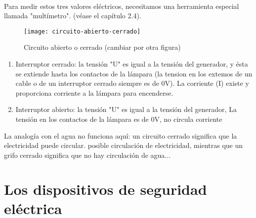 \noindent{}\\

Para medir estos tres valores eléctricos, necesitamos una herramienta especial llamada "multímetro". (véase el capítulo 2.4).

\begin{figure}[h]
\texttt{[image: circuito-abierto-cerrado]} 
\centering
\caption*{Circuito abierto o cerrado (cambiar por otra figura)}
\end{figure}

\begin{enumerate}
\item Interruptor cerrado: la tensión "U" es igual a la tensión del generador, y ésta se extiende hasta los contactos de la lámpara (la tension en los extemos de un cable o de un interruptor cerrado siempre es de 0V). La corriente (I) existe y proporciona corriente a la lámpara para encenderse.
\item Interruptor abierto: la tensión "U" es igual a la tensión del generador, La tensión en los contactos de la lámpara es de 0V, no circula corriente
\end{enumerate}
La analogía con el agua no funciona aquí: un circuito cerrado significa que la electricidad puede circular.
posible circulación de electricidad, mientras que un grifo cerrado significa que no hay
circulación de agua...

\section{Los dispositivos de seguridad eléctrica}

